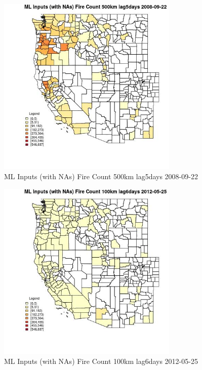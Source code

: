 \begin{figure} 
\centering  
\includegraphics[width=0.77\textwidth]{Code_Outputs/Report_ML_input_PM25_Step4_part_e_de_duplicated_aves_compiled_2019-05-18wNAs_CountyFire_Count_500km_lag5daysMean2008-09-22.jpg} 
\caption{\label{fig:Report_ML_input_PM25_Step4_part_e_de_duplicated_aves_compiled_2019-05-18wNAsCountyFire_Count_500km_lag5daysMean2008-09-22}ML Inputs (with NAs) Fire Count 500km lag5days 2008-09-22} 
\end{figure} 
 

\begin{figure} 
\centering  
\includegraphics[width=0.77\textwidth]{Code_Outputs/Report_ML_input_PM25_Step4_part_e_de_duplicated_aves_compiled_2019-05-18wNAs_CountyFire_Count_100km_lag6daysMean2012-05-25.jpg} 
\caption{\label{fig:Report_ML_input_PM25_Step4_part_e_de_duplicated_aves_compiled_2019-05-18wNAsCountyFire_Count_100km_lag6daysMean2012-05-25}ML Inputs (with NAs) Fire Count 100km lag6days 2012-05-25} 
\end{figure} 
 

